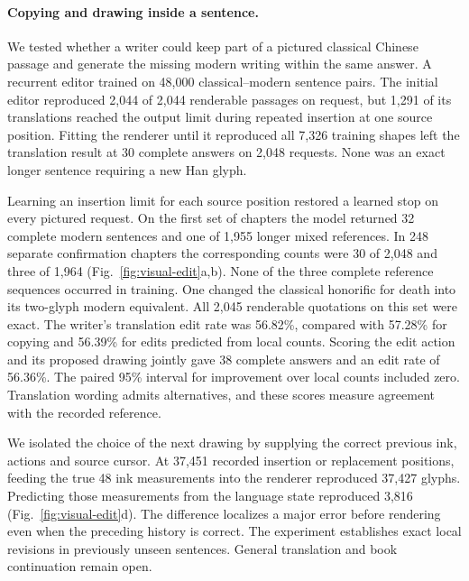 \paragraph{Copying and drawing inside a sentence.}
We tested whether a writer could keep part of a pictured classical Chinese passage and generate the missing modern writing within the same answer. A recurrent editor trained on 48,000 classical--modern sentence pairs. The initial editor reproduced 2,044 of 2,044 renderable passages on request, but 1,291 of its translations reached the output limit during repeated insertion at one source position. Fitting the renderer until it reproduced all 7,326 training shapes left the translation result at 30 complete answers on 2,048 requests. None was an exact longer sentence requiring a new Han glyph.

Learning an insertion limit for each source position restored a learned stop on every pictured request. On the first set of chapters the model returned 32 complete modern sentences and one of 1,955 longer mixed references. In 248 separate confirmation chapters the corresponding counts were 30 of 2,048 and three of 1,964 (Fig.~\ref{fig:visual-edit}a,b). None of the three complete reference sequences occurred in training. One changed the classical honorific for death into its two-glyph modern equivalent. All 2,045 renderable quotations on this set were exact. The writer's translation edit rate was 56.82\%, compared with 57.28\% for copying and 56.39\% for edits predicted from local counts. Scoring the edit action and its proposed drawing jointly gave 38 complete answers and an edit rate of 56.36\%. The paired 95\% interval for improvement over local counts included zero. Translation wording admits alternatives, and these scores measure agreement with the recorded reference.

We isolated the choice of the next drawing by supplying the correct previous ink, actions and source cursor. At 37,451 recorded insertion or replacement positions, feeding the true 48 ink measurements into the renderer reproduced 37,427 glyphs. Predicting those measurements from the language state reproduced 3,816 (Fig.~\ref{fig:visual-edit}d). The difference localizes a major error before rendering even when the preceding history is correct. The experiment establishes exact local revisions in previously unseen sentences. General translation and book continuation remain open.
